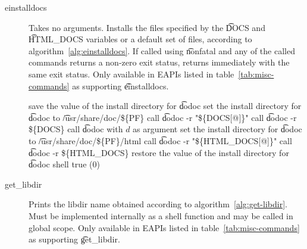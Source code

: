 \begin{description}
\item[einstalldocs]  Takes no arguments. Installs the files specified
    by the \t{DOCS} and \t{HTML_DOCS} variables or a default set of files, according to
    algorithm~\ref{alg:einstalldocs}. If called using \t{nonfatal} and any of the called commands
    returns a non-zero exit status, returns immediately with the same exit status. Only available
    in EAPIs listed in table~\ref{tab:misc-commands} as supporting \t{einstalldocs}.

\begin{algorithm}
\caption{\t{einstalldocs} logic} \label{alg:einstalldocs}
\begin{algorithmic}[1]
\STATE save the value of the install directory for \t{dodoc}
\STATE set the install directory for \t{dodoc} to \t{/usr/share/doc/\$\{PF\}}
    \STATE call \t{dodoc -r "\$\{DOCS[@]\}"}
    \STATE call \t{dodoc -r \$\{DOCS\}}
            \STATE call \t{dodoc} with $d$ as argument
        \ENDIF
    \ENDFOR
\ENDIF
\STATE set the install directory for \t{dodoc} to \t{/usr/share/doc/\$\{PF\}/html}
    \STATE call \t{dodoc -r "\$\{HTML_DOCS[@]\}"}
    \STATE call \t{dodoc -r \$\{HTML_DOCS\}}
\ENDIF
\STATE restore the value of the install directory for \t{dodoc}
\RETURN shell true (0)
\end{algorithmic}
\end{algorithm}

\item[get_libdir]  Prints the libdir name obtained according to
    algorithm~\ref{alg:get-libdir}. Must be implemented internally as a shell function and may be
    called in global scope. Only available in EAPIs listed in table~\ref{tab:misc-commands} as
    supporting \t{get_libdir}.


\end{description}
